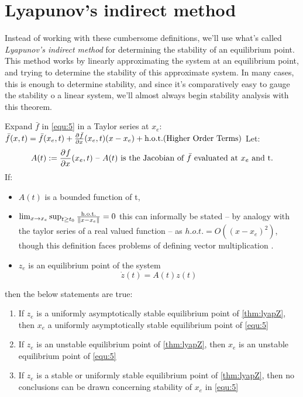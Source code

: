 \section{Lyapunov's indirect method}
Instead of working with these cumbersome definitions, we'll use what's called \textit{Lyapunov's indirect method} for determining the stability of an equilibrium point. This method works by linearly approximating the system at an equilibrium point, and trying to determine the stability of this approximate system. In many cases, this is enough to determine stability, and since it's comparatively easy to gauge the stability o a linear system, we'll almost always begin stability analysis with this theorem.
\thm{}
{
    Expand $\bar{f}$ in \ref{equ:5} in a Taylor series at $x_e$: \\
    $\bar{f}(x,t) = \bar{f}(x_e,t)+ \frac{\partial^{}\bar{f}}{\partial x^{}}(x_e,t)(x-x_e) + \text{h.o.t.(Higher Order Terms)} $
    Let:
    \begin{equation}
        A(t) := \frac{\partial^{}f}{\partial x^{}}(x_e,t)  \text{ -- $A(t)$ is the Jacobian of $\bar{f}$ evaluated at $x_e$ and t.}
        \label{thm:lyapA}
    \end{equation}
If:
\begin{itemize}
        \item $A(t)$ is a bounded function of t,
    \item  $\lim_{x \to x_e} \sup_{t \ge t_0} \frac{\text{h.o.t.}}{\lVert x-x_e\rVert} = 0$ this can informally be stated -- by analogy with the taylor series of a real valued function -- as $h.o.t. = O((x-x_e)^2)$, though this definition faces problems of defining vector multiplication .
        \item $z_e$ is an equilibrium point of the system 
             \begin{equation}
                \label{thm:lyapZ}
                \dot{z}(t) = A(t)z(t)
            \end{equation}
\end{itemize}
then the below statements are true:
\begin{enumerate}
    \item If  $z_e$ is a uniformly asymptotically stable equilibrium point of \ref{thm:lyapZ}, then $x_e$ a uniformly asymptotically stable equilibrium point of \ref{equ:5}
    \item If $z_e$ is an unstable equilibrium point of  \ref{thm:lyapZ}, then $x_e$ is an unstable equilibrium point of \ref{equ:5}
    \item If $z_e$ is a stable or uniformly stable equilibrium point of \ref{thm:lyapZ}, then no conclusions can be drawn concerning stability of $x_e$ in  \ref{equ:5}
\end{enumerate}

}
